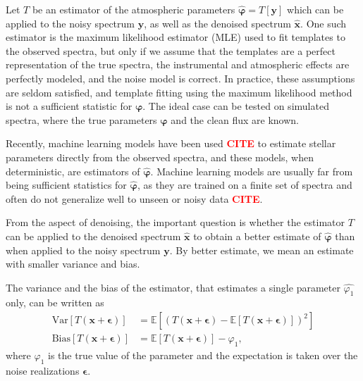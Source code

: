 \documentclass[twocolumn]{aastex7}
\newcommand{\ld}[1]{\textcolor{red}{\textbf{#1}}}
\newcommand{\m}[1]{\boldsymbol{#1}}
\begin{document}
Let $T$ be an estimator of the atmospheric parameters $\hat{\m{\varphi}} = T[\m{y}]$ which can be applied to the noisy spectrum $\m{y}$, as well as the denoised spectrum $\hat{\m{x}}$. One such estimator is the maximum likelihood estimator (MLE) used to fit templates to the observed spectra, but only if we assume that the templates are a perfect representation of the true spectra, the instrumental and atmospheric effects are perfectly modeled, and the noise model is correct. In practice, these assumptions are seldom satisfied, and template fitting using the maximum likelihood method is not a sufficient statistic for $\m{\varphi}$. The ideal case can be tested on simulated spectra, where the true parameters $\m{\varphi}$ and the clean flux are known.

Recently, machine learning models have been used \ld{CITE} to estimate stellar parameters directly from the observed spectra, and these models, when deterministic, are estimators of $\hat{\m{\varphi}}$. Machine learning models are usually far from being sufficient statistics for $\hat{\m{\varphi}}$, as they are trained on a finite set of spectra and often do not generalize well to unseen or noisy data \ld{CITE}.

From the aspect of denoising, the important question is whether the estimator $T$ can be applied to the denoised spectrum $\hat{\m{x}}$ to obtain a better estimate of $\hat{\m{\varphi}}$ than when applied to the noisy spectrum $\m{y}$. By better estimate, we mean an estimate with smaller variance and bias.

The variance and the bias of the estimator, that estimates a single parameter $\hat{\varphi_1}$ only, can be written as
\begin{align}
    \mathrm{Var}[T(\m{x} + \m{\epsilon})] &= \mathbb{E}\!\left[(T(\m{x} + \m{\epsilon}) - \mathbb{E}[T(\m{x} + \m{\epsilon})])^2\right]
    \label{eq:estimator_variance} \\[1em]
    \mathrm{Bias}[T(\m{x} + \m{\epsilon})] &= \mathbb{E}[T(\m{x} + \m{\epsilon})] - \varphi_1,
    \label{eq:estimator_bias}
\end{align}
where $\varphi_1$ is the true value of the parameter and the expectation is taken over the noise realizations $\m{\epsilon}$.
\end{document}
